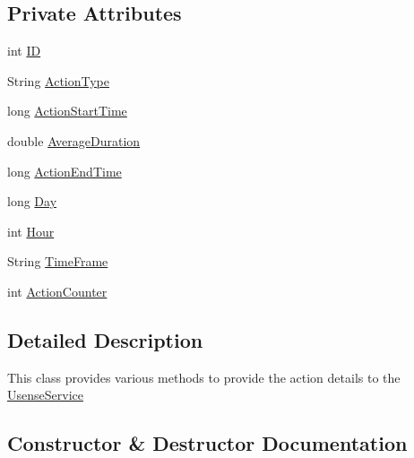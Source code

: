 \subsection*{Private Attributes}
\begin{DoxyCompactItemize}
\item 
int \hyperlink{classcs_1_1usense_1_1accelerometer_1_1_actions_entry_a077d8d1b6c3e31237badfd296e015151}{I\+D}
\item 
String \hyperlink{classcs_1_1usense_1_1accelerometer_1_1_actions_entry_a08da28d6c6a891407f52fc81e7eeb0e9}{Action\+Type}
\item 
long \hyperlink{classcs_1_1usense_1_1accelerometer_1_1_actions_entry_acd929d38dbe3283a66e5ac048692d1d3}{Action\+Start\+Time}
\item 
double \hyperlink{classcs_1_1usense_1_1accelerometer_1_1_actions_entry_a2440a558478b3d1e9c83fde2243319cc}{Average\+Duration}
\item 
long \hyperlink{classcs_1_1usense_1_1accelerometer_1_1_actions_entry_a9f6db6339b2c0d85365993ecd77ff219}{Action\+End\+Time}
\item 
long \hyperlink{classcs_1_1usense_1_1accelerometer_1_1_actions_entry_af3e47531642c02dc7bf5329cd4181dc1}{Day}
\item 
int \hyperlink{classcs_1_1usense_1_1accelerometer_1_1_actions_entry_aa5c1c9efc45255ade6535b7800084ed9}{Hour}
\item 
String \hyperlink{classcs_1_1usense_1_1accelerometer_1_1_actions_entry_a484665a5c5d4a5b3ec03c134a390ebac}{Time\+Frame}
\item 
int \hyperlink{classcs_1_1usense_1_1accelerometer_1_1_actions_entry_ac3b0185f2e16106380c005c89b168127}{Action\+Counter}
\end{DoxyCompactItemize}


\subsection{Detailed Description}
This class provides various methods to provide the action details to the \hyperlink{classcs_1_1usense_1_1_usense_service}{Usense\+Service} 

\subsection{Constructor \& Destructor Documentation}
\hypertarget{classcs_1_1usense_1_1accelerometer_1_1_actions_entry_afe4382a74fc44552648f36567e4cc830}{}
